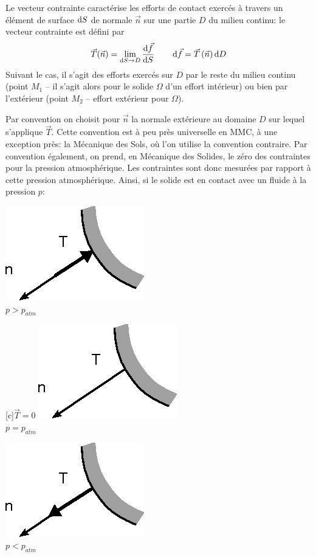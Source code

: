 Le vecteur contrainte caractérise les efforts de contact exercés à travers un élément de surface $\mathop{\mathrm{{}d}}\mathopen{} S$ de normale $\vec{n}$ sur une partie $D$ du milieu continu: le vecteur contrainte est défini par
\begin{equation}
    \vec{T}(\vec{n}) = \lim_{\mathop{\mathrm{{}d}}\mathopen{} S \rightarrow D} \frac{\mathop{\mathrm{{}d}}\mathopen{} \vec{f}}{\mathop{\mathrm{{}d}}\mathopen{} S} \qquad \mathop{\mathrm{{}d}}\mathopen{} \vec{f} = \vec{T}\left( \vec{n} \right) \mathop{\mathrm{{}d}}\mathopen{} D
    \label{eq:Ch02-001}
\end{equation}
Suivant le cas, il s'agit des efforts exercés sur $D$ par le reste du milieu continu (point $M_1$ -- il s'agit alors pour le solide $\Omega$ d'un effort intérieur) ou bien par l'extérieur (point $M_2$ -- effort extérieur pour $\Omega$).

Par convention on choisit pour $\vec{n}$ la normale extérieure au domaine $D$ sur lequel s'applique $\vec{T}$. 
Cette convention est à peu près universelle en MMC, à une exception près: la Mécanique des Sols, où l'on utilise la convention contraire.
Par convention également, on prend, en Mécanique des Solides, le zéro des contraintes pour la pression atmosphérique.
Les contraintes sont donc mesurées par rapport à cette pression atmosphérique.
Ainsi, si le solide est en contact avec un fluide à la pression $p$:
\begin{multicols}{3}
    \centering
    \includegraphics{../images/T1_Ch02-0003a}\\
    $p > p_{atm}$
    \columnbreak

    [c]{$\vec{T}=0$}
    \includegraphics{../images/T1_Ch02-0003b}\\
    $p = p_{atm}$
    \columnbreak

    \includegraphics{../images/T1_Ch02-0003c}\\
    $p < p_{atm}$
\end{multicols}
